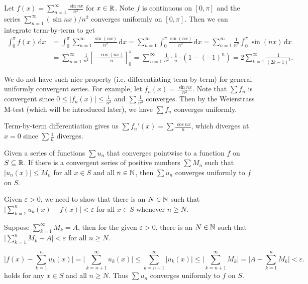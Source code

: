     \begin{exampleenv}
        Let $f(x) = \displaystyle\sum_{n=1}^{\infty}\frac{\sin nx}{n^2}$ for $x\in \mathbb{R}$. Note $f$ is continuous on $[0,\pi]$ and the series \(\displaystyle\sum_{n=1}^{\infty}(\sin nx)/n^2\) converges uniformly on \([0,\pi]\). Then we can integrate term-by-term to get
        \[
        \begin{aligned}
        \int_0^\pi f(x)\,\mathrm{d}x
        &=
        \int_0^\pi \sum_{n=1}^{\infty}\frac{\sin(nx)}{n^2}\,\mathrm{d}x
        =
        \sum_{n=1}^{\infty}\int_0^\pi \frac{\sin(nx)}{n^2}\,\mathrm{d}x 
        =
        \sum_{n=1}^{\infty}\frac{1}{n^2}\int_0^\pi \sin(nx)\,\mathrm{d}x \\
        &=
        \sum_{n=1}^{\infty}\frac{1}{n^2}
        \left[
        -\frac{\cos(nx)}{n}
        \right]_0^\pi
        =
        \sum_{n=1}^{\infty}\frac{1}{n^2}\cdot \frac{1}{n}\cdot (1-(-1)^n) =2\sum_{k=1}^{\infty}\frac{1}{(2k-1)^3}.
        \end{aligned}
        \]
    \end{exampleenv}
    \begin{remarkenv}
        We do not have such nice property (i.e. differentiating term-by-term) for general uniformly convergent series. For example, let $f_n(x) = \displaystyle \frac{\sin nx}{n^2}$. Note that $\sum f_n$ is convergent since $\displaystyle 0\le |f_n(x)| \le \frac{1}{n^2}$ and $\displaystyle \sum \frac{1}{n^2}$ converges. Then by the Weierstrass M-test (which will be introduced later), we have $\sum f_n$ converges uniformly.

        Term-by-term differentiation gives us $\displaystyle \sum f_n'(x) = \sum \frac{\cos nx}{n}$, which diverges at $x=0$ since $\displaystyle \sum \frac{1}{n}$ diverges.
    \end{remarkenv}
    \begin{theoremenv}
        Given a series of functions $\sum u_n$ that converges pointwise to a function $f$ on $S\subseteq \mathbb{R}$. If there is a convergent series of positive numbers $\sum M_n$ such that $|u_n(x)| \le M_n$ for all $x\in S$ and all $n\in \mathbb{N}$, then $\sum u_n$ converges uniformly to $f$ on $S$.
        
        
    \end{theoremenv}
    \begin{proofenv}
        Given $\varepsilon >0$, we need to show that there is an $N\in \mathbb{N}$ such that $\Big|\displaystyle \sum_{k=1}^n u_k(x) - f(x)\Big| < \varepsilon$ for all $x\in S$ whenever $n \ge N$.

        Suppose $\displaystyle \sum_{k=1}^\infty M_k=A$, then for the given $\varepsilon >0$, there is an $N\in \mathbb{N}$ such that $\displaystyle \Big| \sum_{k=1}^n M_k - A \Big| < \varepsilon$ for all $n \ge N$.

        $$ \Big|f(x) - \sum_{k=1}^n u_k(x)\Big| = \Big|\sum_{k=n+1}^\infty u_k(x)\Big| \le \sum_{k=n+1}^\infty |u_k(x)| \le \Big|\sum_{k=n+1}^\infty M_k \Big| = \Big| A - \sum_{k=1}^n M_k \Big| < \varepsilon. $$
        holds for any $x\in S$ and all $n \ge N$. Thus $\sum u_n$ converges uniformly to $f$ on $S$.
    \end{proofenv}

